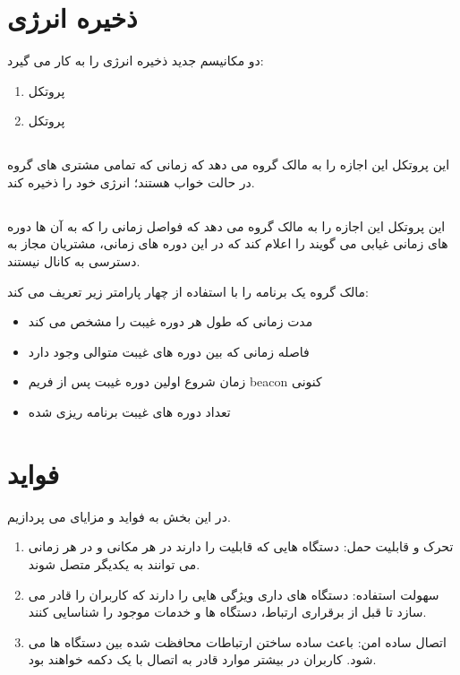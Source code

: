 \section{ذخیره انرژی}
دو مکانیسم جدید ذخیره انرژی را به کار می گیرد:
\begin{enumerate}
	\item پروتکل 
	\item پروتکل 
	
\end{enumerate}
\subsection{}
این پروتکل این اجازه را به مالک گروه می دهد که زمانی که تمامی مشتری های گروه در حالت خواب
هستند؛ انرژی خود را ذخیره کند.

\subsection{}
این پروتکل این اجازه را به مالک گروه می دهد که فواصل زمانی را که به آن ها دوره های زمانی غیابی می گویند را اعلام کند که در این دوره های زمانی، مشتریان مجاز به دسترسی به کانال نیستند.

مالک گروه یک برنامه
  را با استفاده از چهار پارامتر زیر تعریف می کند:
  \begin{itemize}
  	\item مدت زمانی که طول هر دوره غیبت را مشخص می کند
  	\item فاصله زمانی که بین دوره های غیبت متوالی وجود دارد
  	\item زمان شروع اولین دوره غیبت پس از فریم beacon کنونی
  	\item تعداد دوره های غیبت برنامه ریزی شده
  \end{itemize}




\section{فواید}
در این بخش به فواید و مزایای 
می پردازیم.
\begin{enumerate}
	\item تحرک و قابلیت حمل: دستگاه هایی که قابلیت 
	را دارند در هر مکانی و در هر زمانی می توانند به یکدیگر متصل شوند.
	\item سهولت استفاده: دستگاه های داری 
 ویژگی هایی را دارند که کاربران را قادر می سازد تا قبل از برقراری ارتباط، دستگاه ها و خدمات موجود را شناسایی کنند.
     \item اتصال ساده امن: 
      باعث ساده ساختن ارتباطات محافظت شده بین دستگاه ها می شود. کاربران در بیشتر موارد قادر به اتصال با یک دکمه خواهند بود.
\end{enumerate}

